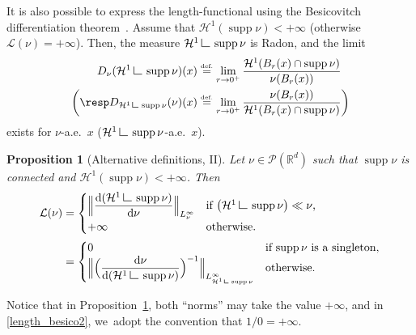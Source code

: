 \documentclass[JEP,XML,SOM,Unicode,NoFloatCountersInSection,published]{cedram}
\newtheorem{proposition}[theorem]{Proposition}
\theoremstyle{definition}
\newcommand{\eqdef}{\ensuremath{\stackrel{\mbox{\upshape\tiny def.}}{=}}}
\newcommand{\Bnorm}[1]{\Bigl\lVert#1\Bigr\rVert}
\newcommand\LM[1]{\hbox{\vrule width.5pt \vbox to#1pt{\vfill \hrule width#1pt height.5pt}}}
\newcommand\LL{{\mathchoice {\>\LM7\>}{\>\LM7\>}{\,\LM5\,}{\,\LM{3.35}\,}}}
\newcommand{\mres}{\LL}
\newcommand\cH{\mathcal{H}}
\newcommand{\RR}{\mathbb{R}}
\DeclareMathOperator{\supp}{supp}
\newcommand\dd{\mathrm{d}}
\begin{document}
It is also possible to express the length-functional using the Besicovitch differentiation theorem~\cite[Th.\,2.22]{ambrosio2000functions}. Assume that $\cH^1(\supp \nu)<+\infty$ (otherwise $\mathcal{L}(\nu)=+\infty$). Then, the measure $\cH^1\mres \supp\nu$ is Radon, and the limit
\begin{align}
D_\nu(\cH^1\mres \supp\nu)(x)&\eqdef \lim_{r \to 0^+} \frac{\cH^1(B_r(x)\cap \supp \nu)}{\nu(B_r(x))} \\ \bigg(\mbox{\resp} D_{\cH^1\mres \supp\nu}(\nu)(x)&\eqdef \lim_{r \to 0^+}\frac{\nu(B_r(x))}{\cH^1(B_r(x)\cap \supp \nu)}\bigg)
\end{align}
exists for $\nu$-a.e.\ $x$ (\resp $\cH^1\mres \supp\nu$-a.e.\ $x$).
\begin{proposition}[Alternative definitions, II]\label{prop.length.besico}
Let $\nu \in \mathcal{P}(\RR^d)$ such that $\supp \nu$ is connected and $\cH^1(\supp \nu)<+\infty$. Then
\begin{align}
\mathcal{L}(\nu) &=
\begin{cases}
\Bnorm{\dfrac{\dd(\cH^1\mres \supp\nu)}{\dd \nu}}_{L^{\infty}_\nu} & \mbox{if $\left(\cH^1\mres \supp \nu\right) \ll \nu$,}\\
+\infty &\mbox{otherwise.}
\end{cases}\label{length_besico1}\\
&=
\begin{cases}
0 & \mbox{if $\supp \nu$ is a singleton,}\\
\Bnorm{\Bigl(\dfrac{\dd \nu}{\dd(\cH^1\mres \supp\nu)}\Bigr)^{-1}}_{L^{\infty}_{\cH^1\mres \supp\nu}} & \mbox{otherwise}.
\end{cases}\label{length_besico2}
\end{align}
\end{proposition}
Notice that in Proposition~\ref{prop.length.besico}, both ``norms'' may take the value $+\infty$, and in \eqref{length_besico2}, we~adopt the convention that $1/0=+\infty$.
\end{document}
